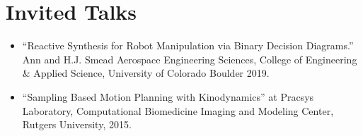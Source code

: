 \section{Invited Talks}

\vspace{6pt}
 
\begin{itemize}

\item[]{“Reactive Synthesis for Robot Manipulation via Binary Decision Diagrams.” Ann and H.J. Smead Aerospace Engineering Sciences, College of Engineering \& Applied Science, University of Colorado Boulder 2019.}

\vspace{6pt}

\item[]{“Sampling Based Motion Planning with Kinodynamics” at Pracsys Laboratory, Computational Biomedicine Imaging and Modeling Center, Rutgers University, 2015.}

\end{itemize}